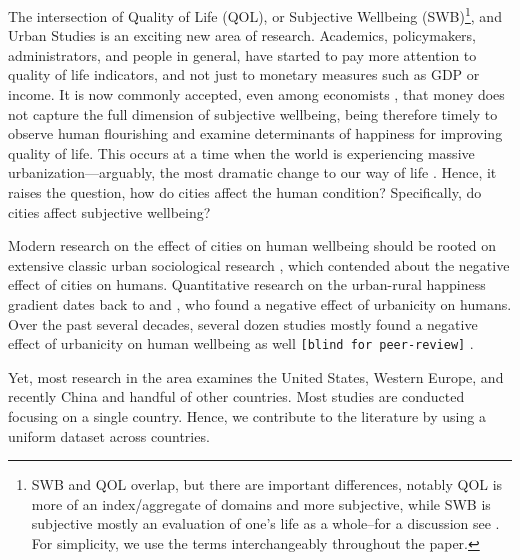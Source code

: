 \documentclass[10pt, letterpaper]{article}
\begin{document}
The intersection of Quality of Life (QOL), or Subjective Wellbeing (SWB)\footnote{SWB and QOL overlap, but there are important differences, notably QOL is more of an index/aggregate of domains and more subjective, while SWB is subjective mostly an evaluation of one's life as a whole--for a discussion see \citet{aok-swbLivability18}. For simplicity, we use the terms interchangeably throughout the paper.}, and Urban Studies is an exciting new area of research.
Academics, policymakers, administrators, and people in general, have started to pay more
attention to quality of life indicators, and not just to monetary measures such
as GDP or income. It is now commonly accepted, even among economists 
\citep{stiglitz09al}, that money does not capture the full dimension of subjective wellbeing, being therefore timely to observe human flourishing and examine determinants of happiness for improving quality of life. This occurs at a time when the world is experiencing massive
urbanization---arguably, the most dramatic change to our way of life \cite{wirth38,hansonCityJournalautumn15}. Hence, it raises the question, how do cities affect the human condition? Specifically, do cities affect subjective wellbeing?


Modern research on the effect of cities on human wellbeing should be rooted on
extensive classic urban sociological research \citep{tonnies57,wirth38,simmel03,park15,park84}, 
which contended about the negative effect of cities on humans.
%
Quantitative research on the urban-rural happiness gradient dates back to
\cite{gurin60} and \cite{campbell76etal}, who found a negative effect of urbanicity on humans. Over the past several decades, several dozen studies mostly found a negative effect of urbanicity on human wellbeing as well
\texttt{[blind for peer-review]}%
. 

Yet, most research in the area examines the United States, Western Europe, and recently China and handful of other countries. Most studies are conducted focusing on a single country. Hence, we contribute to the literature by using a uniform dataset across countries.
\end{document}
